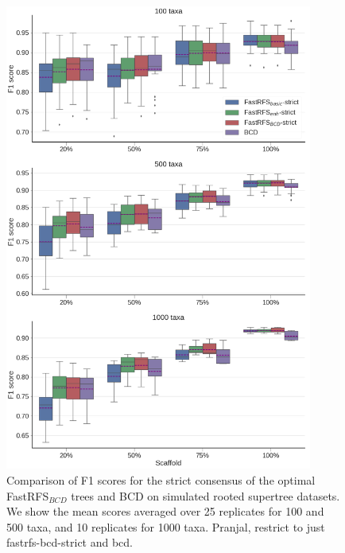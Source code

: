 \begin{figure}
  \centering
  \includegraphics[width=0.9\textwidth]{siesta-supp-figs/fastrfs_smidgenOG_f1}
  \caption[F1 scores for the strict consensus of the optimal FastRFS$_{BCD}$  trees and BCD on
    simulated rooted supertree datasets.]{Comparison of F1 scores for the strict consensus of the optimal FastRFS$_{BCD}$  trees and BCD on
    simulated rooted supertree datasets. We show the mean scores averaged over
    25 replicates for 100 and 500 taxa, and 10 replicates for 1000
    taxa.
    Pranjal, restrict to just fastrfs-bcd-strict and bcd.
    }
  \label{fig:supertree-consensus-comparison-8}
\end{figure}



